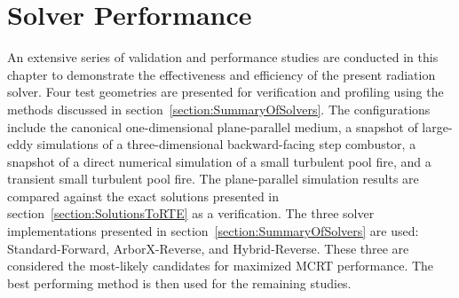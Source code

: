 \addchapheadtotoc
\chapter{Solver Performance}\label{chapter:Example}
An extensive series of validation and performance studies are conducted in this chapter to demonstrate the effectiveness and efficiency of the present radiation solver. 
Four test geometries are presented for verification and profiling using the methods discussed in section~\ref{section:SummaryOfSolvers}. 
The configurations include the canonical one-dimensional plane-parallel medium, a snapshot of large-eddy simulations of a three-dimensional backward-facing step combustor, a snapshot of a direct numerical simulation of a small turbulent pool fire, and a transient small turbulent pool fire. 
The plane-parallel simulation results are compared against the exact solutions presented in section~\ref{section:SolutionsToRTE} as a verification. The three solver implementations presented in section~\ref{section:SummaryOfSolvers} are used: Standard-Forward, ArborX-Reverse, and Hybrid-Reverse. These three are considered the most-likely candidates for maximized MCRT performance. The best performing method is then used for the remaining studies.



